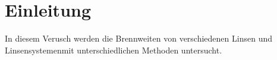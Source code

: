 \section{Einleitung}
In diesem Verusch werden die Brennweiten von verschiedenen Linsen und Linsensystemenmit unterschiedlichen Methoden untersucht.
\label{sec:Einleitung}